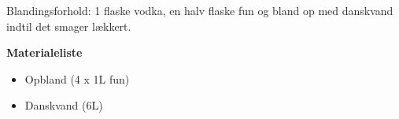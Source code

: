 Blandingsforhold: 1 flaske vodka, en halv flaske fun og bland op med danskvand indtil det smager lækkert.

\textbf{Materialeliste}
\begin{multicols}{2}
\begin{itemize}
  \item Opbland (4 x 1L fun)
  \item Danskvand (6L)
\end{itemize}
\end{multicols}
